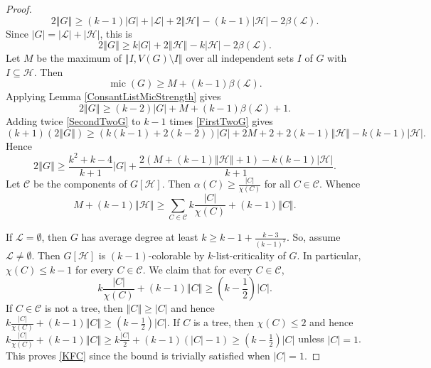 \documentclass[12pt]{article}
\theoremstyle{plain}
\theoremstyle{definition}
\theoremstyle{remark}
\newcommand{\fancy}[1]{\mathcal{#1}}
\newcommand{\C}[1]{\fancy{C}_{#1}}
\renewcommand{\L}{\fancy{L}}
\newcommand{\HH}{\fancy{H}}
\newcommand{\card}[1]{\left|#1\right|}
\newcommand{\size}[1]{\left\Vert#1\right\Vert}
\newcommand{\mic}{\operatorname{mic}}
\def\C{\fancy{C}}
\begin{document}
\begin{proof}
			\begin{equation*}
			  2\size{G} \ge (k-1)\card{G} + \card{\L} + 2\size{\HH} - (k-1)\card{\HH} - 2\beta(\L).
			\end{equation*}
			Since $\card{G} = \card{\L} + \card{\HH}$, this is
			\begin{equation}
			2\size{G} \ge k\card{G} + 2\size{\HH} - k\card{\HH} - 2\beta(\L).
			\label{FirstTwoG}
			\end{equation}
			Let $M$ be the maximum of $\size{I, V(G) \setminus I}$ over all independent sets $I$ of $G$ with $I \subseteq \HH$. Then
			\begin{equation*}
				\mic(G) \ge M + (k-1)\beta(\L).
			\end{equation*}
			Applying Lemma \ref{ConsantListMicStrength} gives
			\begin{equation}
			2\size{G} \ge (k-2)\card{G} + M + (k-1)\beta(\L) + 1.
			\label{SecondTwoG}
			\end{equation}				
			Adding twice \ref{SecondTwoG} to $k-1$ times \ref{FirstTwoG} gives
			\begin{equation*}
				(k+1)(2\size{G}) \ge (k(k-1) + 2(k-2))\card{G} + 2M + 2 + 2(k-1)\size{\HH} - k(k-1)\card{\HH}.
			\end{equation*}
			Hence
			\begin{equation}
			2\size{G} \ge \frac{k^2 + k -4}{k+1}\card{G} + \frac{2(M + (k-1)\size{\HH} + 1) - k(k-1)\card{\HH}}{k+1}.
			\label{ThirdTwoG}
			\end{equation}
			Let $\C$ be the components of $G[\HH]$.  Then $\alpha(C) \ge \frac{\card{C}}{\chi(C)}$ for all $C \in \C$.  Whence
			\begin{equation}
			  M + (k-1)\size{\HH} \ge \sum_{C \in \C} k\frac{\card{C}}{\chi(C)} + (k-1)\size{C}.
			  \label{Mbound}
			\end{equation}
			
			If $\L = \emptyset$, then $G$ has average degree at least $k \ge k-1 + \frac{k-3}{(k-1)^2}$.  So, assume $\L \ne \emptyset$.  Then $G[\HH]$ is $(k-1)$-colorable by $k$-list-criticality of $G$. In particular, $\chi(C) \le k-1$ for every $C \in \C$.
			We claim that for every $C \in \C$,
			\begin{equation}
			 k\frac{\card{C}}{\chi(C)} + (k-1)\size{C} \ge (k - \frac12)\card{C}.
			 \label{KFC}
			\end{equation}
			If $C \in \C$ is not a tree, then $\size{C} \ge \card{C}$ and hence $k\frac{\card{C}}{\chi(C)} + (k-1)\size{C} \ge (k - \frac12)\card{C}$.  If $C$ is a tree, then $\chi(C) \le 2$ and hence 
			$k\frac{\card{C}}{\chi(C)} + (k-1)\size{C} \ge k\frac{\card{C}}{2} + (k-1)(\card{C} - 1) \ge (k-\frac12)\card{C}$ unless $\card{C} = 1$.  This proves \ref{KFC} since the bound is trivially satisfied when $\card{C} = 1$.
			

\end{proof}
\end{document}
